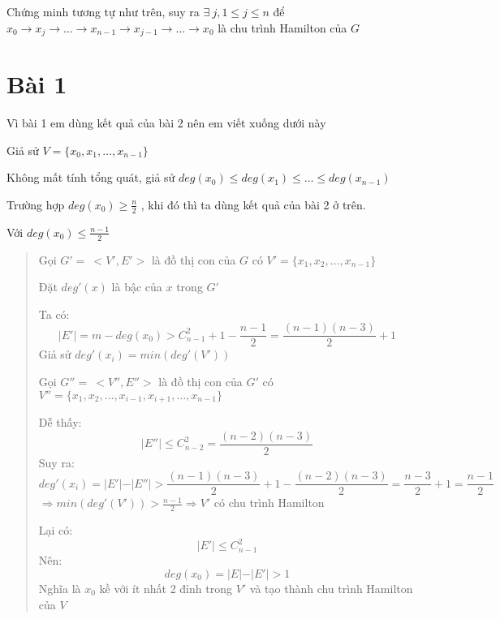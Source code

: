 \documentclass[10pt]{article}
\begin{document}
Chứng minh tương tự như trên, suy ra $\exists \ j, 1 \leq j \leq n$ để \mbox{$x_0 \rightarrow x_j \rightarrow \ldots \rightarrow x_{n-1}\rightarrow x_{j-1} \rightarrow \ldots \rightarrow x_0$} là chu trình Hamilton của $G$

\newpage
\section{Bài 1}
\indent Vì bài 1 em dùng kết quả của bài 2 nên em viết xuống dưới này

Giả sử $V = \{x_0, x_1, \ldots, x_{n-1}\}$

Không mất tính tổng quát, giả sử $deg(x_0) \leq deg(x_1) \leq \ldots \leq deg(x_{n-1})$

Trường hợp $deg(x_0) \geq \frac{n}{2}$ , khi đó thì ta dùng kết quả của bài 2 ở trên.

Với $deg(x_0) \leq \frac{n-1}{2}$
\begin{quote}
    Gọi $G' =\ <V', E'>$ là đồ thị con của $G$ có $V' = \{x_1, x_2, \ldots , x_{n-1}\}$

    Đặt $deg'(x)$ là bậc của $x$ trong $G'$

    Ta có:
    $$\vert E' \vert = m - deg(x_0) > C^2_{n-1} + 1 - \frac{n - 1}{2} = \frac{(n - 1)(n - 3)}{2} + 1$$
    Giả sử $deg'(x_i) = min(deg'(V'))$

    Gọi $G'' =\ < V'', E''>$ là đồ thị con của $G'$ có $V'' = \{x_1, x_2, \ldots, x_{i-1}, x_{i+1}, \ldots, x_{n-1}\}$

    Dễ thấy:
    $$\vert E'' \vert \leq C^2_{n-2} = \frac{(n - 2)(n - 3)}{2}$$
    Suy ra:
    $$deg'(x_i) = \vert E' \vert - \vert E'' \vert > \frac{(n - 1)(n - 3)}{2} + 1 - \frac{(n - 2)(n - 3)}{2} = \frac{n - 3}{2} + 1 = \frac{n - 1}{2}$$
    $\Rightarrow min(deg'(V')) > \frac{n-1}{2} \Rightarrow V'$ có chu trình Hamilton

    Lại có:
    $$\vert E' \vert \leq C^2_{n-1}$$
    Nên:
    $$deg(x_0) = \vert E \vert - \vert E' \vert > 1$$
    Nghĩa là $x_0$ kề với ít nhất 2 đỉnh trong $V'$ và tạo thành chu trình Hamilton của $V$
\end{quote}
\end{document}
